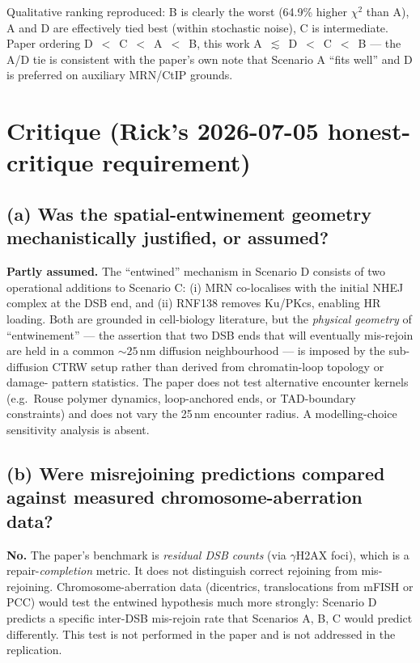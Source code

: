 \documentclass[11pt]{article}
\begin{document}
Qualitative ranking reproduced: B is clearly the worst
(64.9\% higher $\chi^2$ than A), A and D are effectively tied best
(within stochastic noise), C is intermediate. Paper ordering
D~$<$~C~$<$~A~$<$~B, this work A~$\lesssim$~D~$<$~C~$<$~B --- the
A/D tie is consistent with the paper's own note that Scenario A
``fits well'' and D is preferred on auxiliary MRN/CtIP grounds.

\section{Critique (Rick's 2026-07-05 honest-critique requirement)}

\subsection*{(a) Was the spatial-entwinement geometry mechanistically
justified, or assumed?}
\textbf{Partly assumed.} The ``entwined'' mechanism in Scenario D
consists of two operational additions to Scenario C:
(i) MRN co-localises with the initial NHEJ complex at the DSB end,
and (ii) RNF138 removes Ku/PKcs, enabling HR loading. Both are
grounded in cell-biology literature, but the \emph{physical
geometry} of ``entwinement'' --- the assertion that two DSB ends
that will eventually mis-rejoin are held in a common ${\sim}25$\,nm
diffusion neighbourhood --- is imposed by the sub-diffusion CTRW
setup rather than derived from chromatin-loop topology or damage-
pattern statistics. The paper does not test alternative encounter
kernels (e.g.\ Rouse polymer dynamics, loop-anchored ends, or
TAD-boundary constraints) and does not vary the 25\,nm encounter
radius. A modelling-choice sensitivity analysis is absent.

\subsection*{(b) Were misrejoining predictions compared against
measured chromosome-aberration data?}
\textbf{No.} The paper's benchmark is \emph{residual DSB counts}
(via $\gamma$H2AX foci), which is a repair-\emph{completion} metric.
It does not distinguish correct rejoining from mis-rejoining.
Chromosome-aberration data (dicentrics, translocations from mFISH
or PCC) would test the entwined hypothesis much more strongly:
Scenario D predicts a specific inter-DSB mis-rejoin rate that
Scenarios A, B, C would predict differently. This test is not
performed in the paper and is not addressed in the replication.
\end{document}

